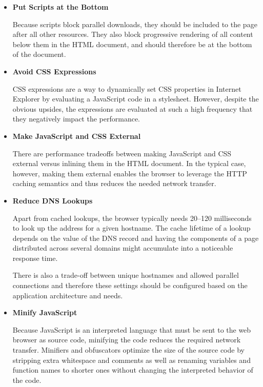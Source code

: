 \begin{itemize}
\item \textbf{Put Scripts at the Bottom}

  Because scripts block parallel downloads, they should be included to
  the page after all other resources. They also block progressive
  rendering of all content below them in the HTML document, and should
  therefore be at the bottom of the document.

\item \textbf{Avoid CSS Expressions}

  CSS expressions are a way to dynamically set CSS properties in
  Internet Explorer by evaluating a JavaScript code in a
  stylesheet. However, despite the obvious upsides, the expressions
  are evaluated at such a high frequency that they negatively impact
  the performance.

\item \textbf{Make JavaScript and CSS External}

  There are performance tradeoffs between making JavaScript and CSS
  external versus inlining them in the HTML document. In the typical
  case, however, making them external enables the browser to leverage
  the HTTP caching semantics and thus reduces the needed network
  transfer.

\item \textbf{Reduce DNS Lookups}

  Apart from cached  lookups, the browser typically needs
  20--120 milliseconds to look up the  address for a given
  hostname. The cache lifetime of a lookup depends on the 
  value of the DNS record and having the components of a page
  distributed across several domains might accumulate into a
  noticeable response time.

  There is also a trade-off between unique hostnames and allowed
  parallel connections and therefore these settings should be
  configured based on the application architecture and needs.

\item \textbf{Minify JavaScript}

  Because JavaScript is an interpreted language that must be sent to
  the web browser as source code, minifying the code reduces the
  required network transfer. Minifiers and obfuscators optimize the
  size of the source code by stripping extra whitespace and comments
  as well as renaming variables and function names to shorter ones
  without changing the interpreted behavior of the code.


\end{itemize}
